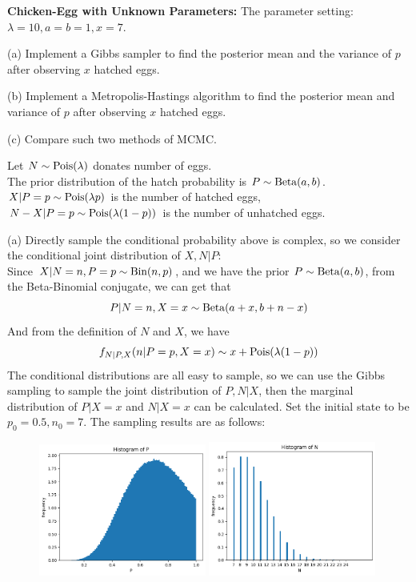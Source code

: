 \begin{homeworkProblem}

\textbf{Chicken-Egg with Unknown Parameters:} The parameter setting: $\lambda=10, a=b=1, x=7$.

(a) Implement a Gibbs sampler to find the posterior mean and the variance of $p$ after observing $x$ hatched eggs.

(b) Implement a Metropolis-Hastings algorithm to find the posterior mean and variance of $p$ after observing $x$ hatched eggs.

(c) Compare such two methods of MCMC.

\solution

Let $N\sim\operatorname{Pois}(\lambda)$ donates number of eggs. \\
The prior distribution of the hatch probability is $P\sim\operatorname{Beta}(a,b)$. \\
$X|P=p\sim\operatorname{Pois}(\lambda p)$ is the number of hatched eggs, $N-X|P=p\sim\operatorname{Pois}(\lambda(1-p))$ is the number of unhatched eggs.

(a) Directly sample the conditional probability above is complex, so we consider the conditional joint distribution of $X,N|P$: \\
Since $X|N=n,P=p\sim\operatorname{Bin}(n,p)$, and we have the prior $P\sim\operatorname{Beta}(a,b)$, from the Beta-Binomial conjugate, we can get that
$$P|N=n,X=x\sim\operatorname{Beta}(a+x,b+n-x)$$
And from the definition of $N$ and $X$, we have
$$f_{N|P,X}(n|P=p,X=x) \sim x + \operatorname{Pois}(\lambda(1-p))$$
The conditional distributions are all easy to sample, so we can use the Gibbs sampling to sample the joint distribution of $P,N|X$, then the marginal distribution of $P|X=x$ and $N|X=x$ can be calculated. Set the initial state to be $p_0=0.5, n_0=7$.  The sampling results are as follows:
\begin{figure}[h]
    \centering
    \includegraphics[width=0.49\textwidth]{./figure/p8/Gibbs_P.png}
    \includegraphics[width=0.49\textwidth]{./figure/p8/Gibbs_N.png}
\end{figure}


\end{homeworkProblem}
